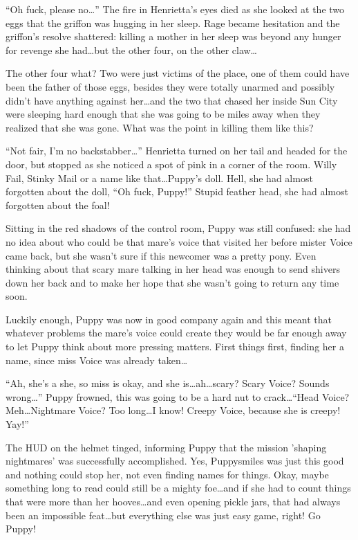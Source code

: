 ``Oh fuck, please no\dots'' The fire in Henrietta's eyes died as she looked at the two eggs that the griffon was hugging in her sleep. Rage became hesitation and the griffon's resolve shattered: killing a mother in her sleep was beyond any hunger for revenge she had\dots but the other four, on the other claw\dots

The other four what? Two were just victims of the place, one of them could have been the father of those eggs, besides they were totally unarmed and possibly didn't have anything against her\dots and the two that chased her inside Sun City were sleeping hard enough that she was going to be miles away when they realized that she was gone. What was the point in killing them like this?

``Not fair, I'm no backstabber\dots'' Henrietta turned on her tail and headed for the door, but stopped as she noticed a spot of pink in a corner of the room. Willy Fail, Stinky Mail or a name like that\dots Puppy's doll. Hell, she had almost forgotten about the doll, ``Oh fuck, Puppy!'' Stupid feather head, she had almost forgotten about the foal!

\horizonline


Sitting in the red shadows of the control room, Puppy was still confused: she had no idea about who could be that mare's voice that visited her before mister Voice came back, but she wasn't sure if this newcomer was a pretty pony. Even thinking about that scary mare talking in her head was enough to send shivers down her back and to make her hope that she wasn't going to return any time soon.

Luckily enough, Puppy was now in good company again and this meant that whatever problems the mare's voice could create they would be far enough away to let Puppy think about more pressing matters. First things first, finding her a name, since miss Voice was already taken\dots

``Ah, she's a she, so miss is okay, and she is\dots ah\dots scary? Scary Voice? Sounds wrong\dots'' Puppy frowned, this was going to be a hard nut to crack\dots ``Head Voice? Meh\dots Nightmare Voice? Too long\dots I know! Creepy Voice, because she is creepy! Yay!''

The HUD on the helmet tinged, informing Puppy that the mission 'shaping nightmares' was successfully accomplished. Yes, Puppysmiles was just this good and nothing could stop her, not even finding names for things. Okay, maybe something long to read could still be a mighty foe\dots and if she had to count things that were more than her hooves\dots and even opening pickle jars, that had always been an impossible feat\dots but everything else was just easy game, right! Go Puppy!

